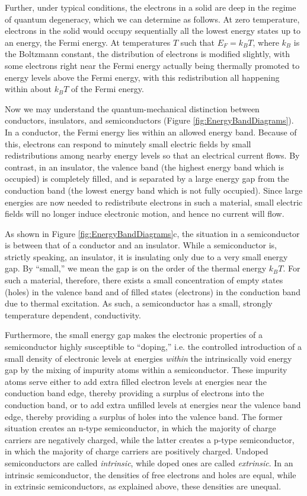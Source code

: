 \documentclass{../lab}
\begin{document}
Further, under typical conditions, the electrons in a solid are deep in the regime of quantum degeneracy, which we can determine as follows. At zero temperature, electrons in the solid would occupy sequentially all the lowest energy states up to an energy, the Fermi energy. At temperatures $T$ such that $E_F = k_B T$, where $k_B$ is the Boltzmann constant, the distribution of electrons is modified slightly, with some electrons right near the Fermi energy actually being thermally promoted to energy levels above the Fermi energy, with this redistribution all happening within about $k_B T$ of the Fermi energy.

Now we may understand the quantum-mechanical distinction between conductors, insulators, and semiconductors (Figure \ref{fig:EnergyBandDiagrams}). In a conductor, the Fermi energy lies within an allowed energy band. Because of this, electrons can respond to minutely small electric fields by small redistributions among nearby energy levels so that an electrical current flows. By contrast, in an insulator, the valence band (the highest energy band which is occupied) is completely filled, and is separated by a large energy gap from the conduction band (the lowest energy band which is not fully occupied). Since large energies are now needed to redistribute electrons in such a material, small electric fields will no longer induce electronic motion, and hence no current will flow.

As shown in Figure \ref{fig:EnergyBandDiagrams}c, the situation in a semiconductor is between that of a conductor and an insulator. While a semiconductor is, strictly speaking, an insulator, it is insulating only due to a very small energy gap. By ``small,'' we mean the gap is on the order of the thermal energy $k_B T$. For such a material, therefore, there exists a small concentration of empty states (holes) in the valence band and of filled states (electrons) in the conduction band due to thermal excitation. As such, a semiconductor has a small, strongly temperature dependent, conductivity.

Furthermore, the small energy gap makes the electronic properties of a semiconductor highly susceptible to ``doping,'' i.e. the controlled introduction of a small density of electronic levels at energies \emph{within} the intrinsically void energy gap by the mixing of impurity atoms within a semiconductor. These impurity atoms serve either to add extra filled electron levels at energies near the conduction band edge, thereby providing a surplus of electrons into the conduction band, or to add extra unfilled levels at energies near the valence band edge, thereby providing a surplus of holes into the valence band. The former situation creates an n-type semiconductor, in which the majority of charge carriers are negatively charged, while the latter creates a p-type semiconductor, in which the majority of charge carriers are positively charged. Undoped semiconductors are called \emph{intrinsic}, while doped ones are called \emph{extrinsic}. In an intrinsic semiconductor, the densities of free electrons and holes are equal, while in extrinsic semiconductors, as explained above, these densities are unequal.
\end{document}
